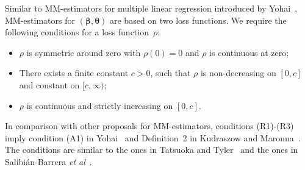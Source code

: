 \documentclass{article}
\numberwithin{equation}{section}
\theoremstyle{plain}
\newcommand{\bbeta}{\bm\beta}
\newcommand{\btheta}{\bm\theta}
\begin{document}
Similar to MM-estimators for multiple linear regression introduced by Yohai~\cite{yohai1987}, 
MM-estimators for $(\bbeta,\btheta)$ are based on two loss functions.
We require the following conditions for a loss function~$\rho$:
\begin{itemize}
\item[(R1)]
$\rho$ is symmetric around zero with $\rho(0)=0$ and $\rho$ is continuous at zero;
\item[(R2)]
There exists a finite constant $c>0$, such that $\rho$ is non-decreasing on $[0,c]$ and constant on $[c,\infty)$;
\item[(R3)]
$\rho$ is continuous and strictly increasing on $[0,c]$.
\end{itemize}
In comparison with other proposals for MM-estimators,
conditions (R1)-(R3) imply condition (A1) in Yohai~\cite{yohai1987}
and Definition~2 in Kudraszow and Maronna~\cite{kudraszow-maronna2011}.
The conditions are similar to the ones in Tatsuoka and Tyler~\cite{tatsuoka&tyler2000}
and the ones in Salibi\'an-Barrera \textit{et al}~\cite{SalibianBarrera-VanAelst-Willems2006}.
\end{document}
